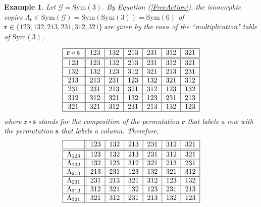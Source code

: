 \documentclass{article}
\newtheorem{example}[theorem]{Example}
\begin{document}
\begin{example}
Let $\mathcal{G}=\mathrm{Sym}(3)$. By Equation (\ref{FreeAction}), the
isomorphic copies $\Lambda _{\mathbf{r}}\in \mathrm{Sym}(\mathcal{G})=%
\mathrm{Sym}(\mathrm{Sym}(3))=\mathrm{Sym}(6)$ of $\mathbf{r}\in
\{123,132,213,231,312,321\}\mathcal{\ }$are given by the rows of the
``multiplication" table of $\mathrm{Sym}(3) $,
 
\begin{equation}
\begin{tabular}{|c||l|l|l|l|l|l|}
\hline
$\mathbf{r}\circ \mathbf{s}$ & $123$ & $132$ & $213$ & $231$ & $312$ & $321$
\\ \hline\hline
$123$ & $123$ & $132$ & $213$ & $231$ & $312$ & $321$ \\ \hline
$132$ & $132$ & $123$ & $312$ & $321$ & $213$ & $231$ \\ \hline
$213$ & $213$ & $231$ & $123$ & $132$ & $321$ & $312$ \\ \hline
$231$ & $231$ & $213$ & $321$ & $312$ & $123$ & $132$ \\ \hline
$312$ & $312$ & $321$ & $132$ & $123$ & $231$ & $213$ \\ \hline
$321$ & $321$ & $312$ & $231$ & $213$ & $132$ & $123$ \\ \hline
\end{tabular}
\label{mult table Sym(3)}
\end{equation}%
where $\mathbf{r}\circ \mathbf{s}$ stands for the composition of the
permutation $\mathbf{r}$ that labels a row with the permutation $\mathbf{s}$ that labels a column. Therefore, 
\begin{equation}
\begin{tabular}{|c||l|l|l|l|l|l|}
\hline
& $123$ & $132$ & $213$ & $231$ & $312$ & $321$ \\ \hline\hline
$\Lambda _{123}$ & $123$ & $132$ & $213$ & $231$ & $312$ & $321$ \\ \hline
$\Lambda _{132}$ & $132$ & $123$ & $312$ & $321$ & $213$ & $231$ \\ \hline
$\Lambda _{213}$ & $213$ & $231$ & $123$ & $132$ & $321$ & $312$ \\ \hline
$\Lambda _{231}$ & $231$ & $213$ & $321$ & $312$ & $123$ & $132$ \\ \hline
$\Lambda _{312}$ & $312$ & $321$ & $132$ & $123$ & $231$ & $213$ \\ \hline
$\Lambda _{321}$ & $321$ & $312$ & $231$ & $213$ & $132$ & $123$ \\ \hline
\end{tabular}

\end{equation}
\end{example}
\end{document}
